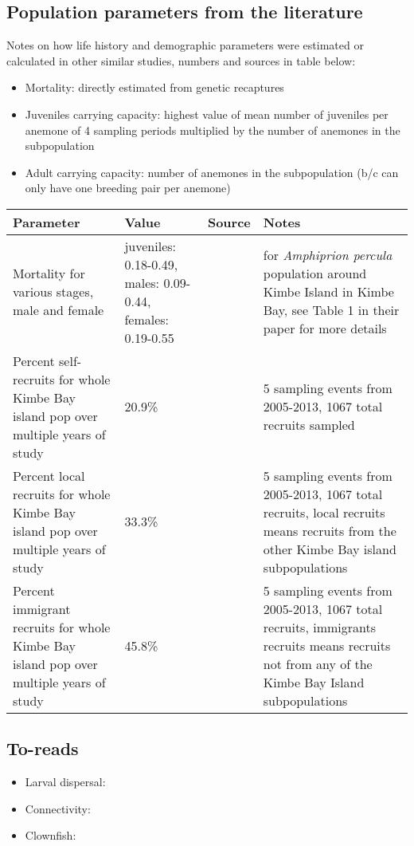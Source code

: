 \documentclass[12pt, oneside]{article}   	%
\begin{document}
\subsection*{Population parameters from the literature}
Notes on how life history and demographic parameters were estimated or calculated in other similar studies, numbers and sources in table below:
\begin{itemize}
\item Mortality: directly estimated from genetic recaptures \citep{salles_coral_2015}
\item Juveniles carrying capacity: highest value of mean number of juveniles per anemone of 4 sampling periods multiplied by the number of anemones in the subpopulation \citep{salles_coral_2015}
\item Adult carrying capacity: number of anemones in the subpopulation (b/c can only have one breeding pair per anemone) \citep{salles_coral_2015}
\end{itemize}

\begin{longtable} { |p{1.5in}|p{1.0in}|p{1.5in}|p{1.5in}| } 
\hline{}
\textbf{Parameter} & \textbf{Value} & \textbf{Source} & \textbf{Notes} \\ \hline
Mortality for various stages, male and female & juveniles: 0.18-0.49, males: 0.09-0.44, females: 0.19-0.55 & \citep{salles_coral_2015} & for \textit{Amphiprion percula} population around Kimbe Island in Kimbe Bay, see Table 1 in their paper for more details \\ \hline
Percent self-recruits for whole Kimbe Bay island pop over multiple years of study & 20.9\% & \citep{salles_coral_2015} & 5 sampling events from 2005-2013, 1067 total recruits sampled \\ \hline
Percent local recruits for whole Kimbe Bay island pop over multiple years of study & 33.3\% & \citep{salles_coral_2015} & 5 sampling events from 2005-2013, 1067 total recruits, local recruits means recruits from the other Kimbe Bay island subpopulations \\ \hline
Percent immigrant recruits for whole Kimbe Bay island pop over multiple years of study & 45.8\%  & \citep{salles_coral_2015} & 5 sampling events from 2005-2013, 1067 total recruits, immigrants recruits means recruits not from any of the Kimbe Bay Island subpopulations \\ \hline
\end{longtable}

\subsection*{To-reads}
\begin{itemize}
\item Larval dispersal: \cite{d2015patterns}
\item Connectivity:
\item Clownfish: \cite{buston2011probability}
\end{itemize}
\end{document}
